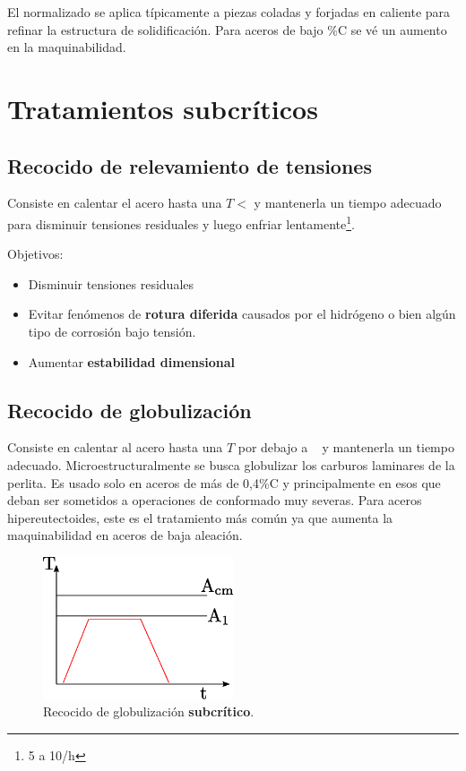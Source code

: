 El normalizado se aplica típicamente a piezas coladas y forjadas en caliente para refinar la estructura de solidificación. Para aceros de bajo \%C se vé un aumento en la maquinabilidad.
\section{Tratamientos subcríticos}

\subsection{Recocido de relevamiento de tensiones}
Consiste en calentar el acero hasta una $T<$\Aone{} y mantenerla un tiempo adecuado para disminuir tensiones residuales y luego enfriar lentamente\footnote{5 a 10\grad/h}.

Objetivos:
\begin{itemize}
    \item Disminuir tensiones residuales
    \item Evitar fenómenos de \textbf{rotura diferida} causados por el hidrógeno o bien algún tipo de corrosión bajo tensión.
    \item Aumentar \textbf{estabilidad dimensional}
\end{itemize}

\subsection{Recocido de globulización}
Consiste en calentar al acero hasta una $T$ por debajo a \Aone~ y mantenerla un tiempo adecuado. Microestructuralmente se busca globulizar los carburos laminares de la perlita. Es usado solo en aceros de más de 0,4\%C y principalmente en esos que deban ser sometidos a operaciones de conformado muy severas. Para aceros hipereutectoides, este es el tratamiento más común ya que aumenta la maquinabilidad en aceros de baja aleación.

\begin{figure}[htb!]
    \centering
    \includegraphics[width=0.5\textwidth]{fig/TTglob.eps}
    \caption{Recocido de globulización \textbf{subcrítico}.}
    \label{fig:TTglob}
\end{figure}

